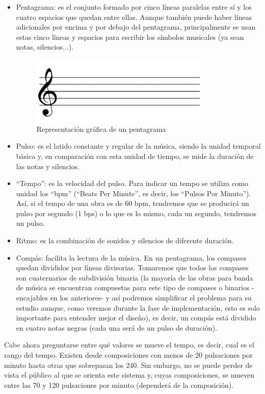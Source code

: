\begin{itemize}
\item Pentagrama: es el conjunto formado por cinco líneas paralelas entre sí y los cuatro espacios que quedan entre ellas. Aunque también puede haber líneas adicionales por encima y por debajo del pentagrama, principalmente se usan estas cinco líneas y espacios para escribir los símbolos musicales (ya sean notas, silencios...).
  \begin{figure}[htb]
  \centering
  \includegraphics[width=0.8\textwidth]{./imagenes/pentagrama}
  \caption{Representación gráfica de un pentagrama} \label{fig:pentagrama}
  \end{figure}
\item Pulso: es el latido constante y regular de la música, siendo la unidad temporal básica y, en comparación con esta unidad de tiempo, se mide la duración de las notas y silencios.
\item “Tempo”: es la velocidad del pulso. Para indicar un tempo se utiliza como unidad los “bpm” (“Beats Per Minute”, es decir, los “Pulsos Por Minuto”). Así, si el tempo de una obra es de 60 bpm, tendremos que se producirá un pulso por segundo (1 bps) o lo que es lo mismo, cada un segundo, tendremos un pulso.
\item Ritmo: es la combinación de sonidos y silencios de diferente duración.
\item Compás: facilita la lectura de la música. En un pentagrama, los compases quedan divididos por líneas divisorias. Tomaremos que todos los compases son cuaternarios de subdivisión binaria (la mayoría de las obras para banda de música se encuentran compuestas para este tipo de compases o binarios -encajables en los anteriores- y así podremos simplificar el problema para su estudio aunque, como veremos durante la fase de implementación, esto es solo importante para entender mejor el diseño), es decir, un compás está dividido en cuatro notas negras (cada una será de un pulso de duración).
\end{itemize}

Cabe ahora preguntarse entre qué valores se mueve el tempo, es decir, cual es el rango
del tempo. Existen desde composiciones con menos de 20 pulsaciones por minuto hasta
otras que sobrepasan los 240. Sin embargo, no se puede perder de vista
el público al que se orienta este sistema y, cuyas composiciones, se mueven entre las 70 y 120 pulsaciones
por minuto (dependerá de la composición).\\

